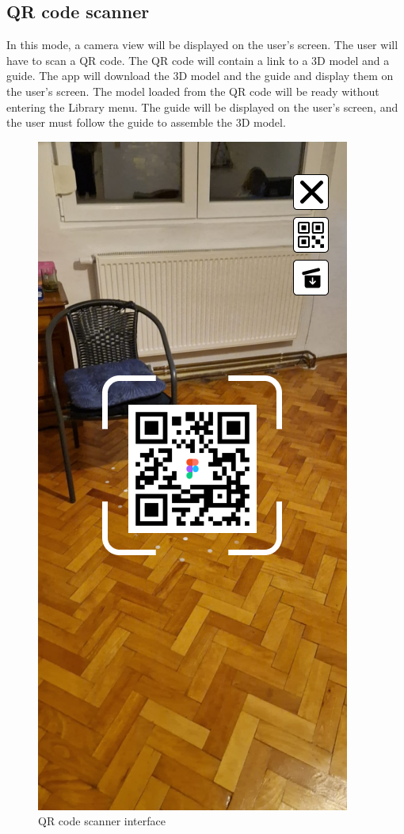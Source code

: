 \subsection{QR code scanner}
In this mode, a camera view will be displayed on the user's screen. The user will have to scan a \ac{QR} code. The \ac{QR} code will contain a link to a \ac{3D} model and a guide. The app will download the \ac{3D} model and the guide and display them on the user's screen. The model loaded from the \ac{QR} code will be ready without entering the Library menu. The guide will be displayed on the user's screen, and the user must follow the guide to assemble the \ac{3D} model.

\begin{figure}[h!]
    \begin{center}
        \includegraphics[scale=0.5]{img/App_mock/iPhone 14 - 3.png}
        \caption{\ac{QR} code scanner interface}
        \label{fig:qr-scanner}
    \end{center}
\end{figure}
\pagebreak

